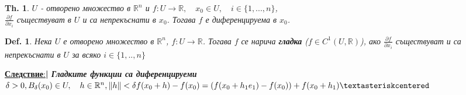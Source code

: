 \documentclass[12pt]{article}
\newcommand{\halfbox}[1]{\underline{\textbf{#1}:}\textbf{\large{| }}}
\newtheorem{definition}{Def.}
\newtheorem{theorem}{Th.}
\begin{document}
	\begin{theorem}
		$U$ - отворено множество в $\mathbb{R}^n$ и $f:U\rightarrow \mathbb{R},\quad x_0\in U,\quad i\in\{1,...,n\}$,\\
		$\frac{\partial f}{\partial x_i}$ съществуват в $U$ и са непрекъснати в $x_0$. Тогава $f$ е диференцируема в $x_0$.
	\end{theorem}
	\begin{definition}
		Нека $U$ е отворено множество в $\mathbb{R}^n$, $f: U \rightarrow \mathbb{R}$. Тогава 
		$f$ се нарича \textbf{гладка} ($f\in C^1(U, \mathbb{R})$), ако $\frac{\partial f}{\partial x_i}$ съществуват и са непрекъснати в $U$ за всяко $i\in\{1,..,n\}$\\
	\end{definition}
	\halfbox{Следствие}\textbf{\textit{Гладките функции са диференцируеми}}\\
	\begin{math}
		\delta > 0, B_\delta(x_0) \in U, \quad h \in \mathbb{R}^n, \|h\| < \delta\\
		f(x_0+h)-f(x_0)=(f(x_0 + h_1e_1) - f(x_0)) + f(x_0 + h_1)
		\textasteriskcentered
	\end{math}
\end{document}
